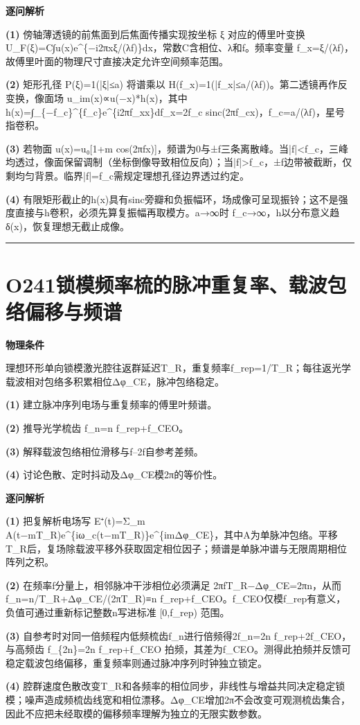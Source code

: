\documentclass[UTF8,a4paper,11pt,oneside,openany]{ctexbook}
\begin{document}
\par\medskip\noindent\textbf{逐问解析}
\par\noindent\textbf{(1)} 傍轴薄透镜的前焦面到后焦面传播实现按坐标 ξ 对应的傅里叶变换 U\_F(ξ)=C∫u(x)e\textasciicircum{}\{−i2πxξ/(λf)\}dx，常数C含相位、λ和f。频率变量 f\_x=ξ/(λf)，故傅里叶面的物理尺寸直接决定允许空间频率范围。
\par\noindent\textbf{(2)} 矩形孔径 P(ξ)=1(|ξ|≤a) 将谱乘以 H(f\_x)=1(|f\_x|≤a/(λf))。第二透镜再作反变换，像面场 u\_im(x)∝u(−x)*h(x)，其中 h(x)=∫\_\{−f\_c\}\textasciicircum{}\{f\_c\}e\textasciicircum{}\{i2πf\_xx\}df\_x=2f\_c sinc(2πf\_cx)，f\_c=a/(λf)，星号指卷积。
\par\noindent\textbf{(3)} 若物面 u(x)=u₀[1+m cos(2πfx)]，频谱为0与±f三条离散峰。当|f|<f\_c，三峰均透过，像面保留调制（坐标倒像导致相位反向）；当|f|>f\_c，±f边带被截断，仅剩均匀背景。临界|f|=f\_c需规定理想孔径边界透过约定。
\par\noindent\textbf{(4)} 有限矩形截止的h(x)具有sinc旁瓣和负振幅环，场成像可呈现振铃；这不是强度直接与h卷积，必须先算复振幅再取模方。a→∞时 f\_c→∞，h以分布意义趋δ(x)，恢复理想无截止成像。

\par\bigskip\hrule\bigskip
\section*{O241\quad 锁模频率梳的脉冲重复率、载波包络偏移与频谱}
\textbf{物理条件}\par 理想环形单向锁模激光腔往返群延迟T\_R，重复频率f\_rep=1/T\_R；每往返光学载波相对包络多积累相位Δφ\_CE，脉冲包络稳定。
\par\noindent\textbf{(1)} 建立脉冲序列电场与重复频率的傅里叶频谱。
\par\noindent\textbf{(2)} 推导光学梳齿 f\_n=n f\_rep+f\_CEO。
\par\noindent\textbf{(3)} 解释载波包络相位滑移与f–2f自参考差频。
\par\noindent\textbf{(4)} 讨论色散、定时抖动及Δφ\_CE模2π的等价性。

\par\medskip\noindent\textbf{逐问解析}
\par\noindent\textbf{(1)} 把复解析电场写 E⁺(t)=Σ\_m A(t−mT\_R)e\textasciicircum{}\{iω\_c(t−mT\_R)\}e\textasciicircum{}\{imΔφ\_CE\}，其中A为单脉冲包络。平移T\_R后，复场除载波平移外获取固定相位因子；频谱是单脉冲谱与无限周期相位阵列之积。
\par\noindent\textbf{(2)} 在频率f分量上，相邻脉冲干涉相位必须满足 2πfT\_R−Δφ\_CE=2πn，从而 f\_n=n/T\_R+Δφ\_CE/(2πT\_R)≡n f\_rep+f\_CEO。f\_CEO仅模f\_rep有意义，负值可通过重新标记整数n写进标准 [0,f\_rep) 范围。
\par\noindent\textbf{(3)} 自参考时对同一倍频程内低频梳齿f\_n进行倍频得2f\_n=2n f\_rep+2f\_CEO，与高频齿 f\_\{2n\}=2n f\_rep+f\_CEO 拍频，其差为f\_CEO。测得此拍频并反馈可稳定载波包络偏移，重复频率则通过脉冲序列时钟独立锁定。
\par\noindent\textbf{(4)} 腔群速度色散改变T\_R和各频率的相位同步，非线性与增益共同决定稳定锁模；噪声造成频梳齿线宽和相位漂移。Δφ\_CE增加2π不会改变可观测梳齿集合，因此不应把未经取模的偏移频率理解为独立的无限实数参数。
\end{document}
